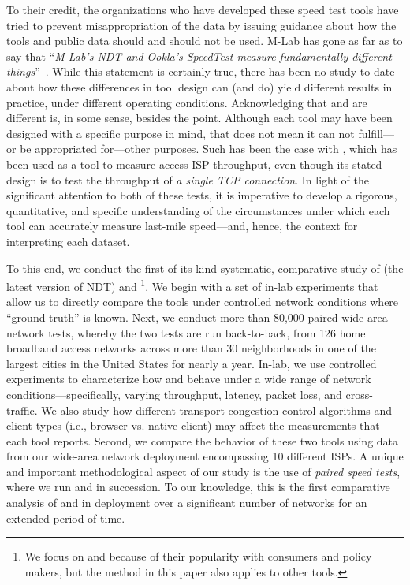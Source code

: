 To their credit, the organizations who have developed these speed test tools
have tried to prevent misappropriation of the data by issuing guidance about how
the tools and public data should and should not be used. M-Lab has gone as far
as to say that ``\textit{M-Lab's NDT and Ookla's SpeedTest measure fundamentally
different things}''~\cite{mlab-issue-email-1}. While this statement is certainly
true, there has been no study to date about how these differences in tool design
can (and do) yield different results in practice, under different operating
conditions. Acknowledging that \ookla and \ndt are different is, in some sense,
besides the point. %
Although each tool may have been designed with a specific purpose in mind, that
does not mean it can not fulfill---or be appropriated for---other purposes. Such
has been the case with \ndt, which has been used as a tool to measure access ISP
throughput, even though its stated design is to test the throughput of {\em a
single TCP connection}. In light of the significant attention to both of these
tests, it is imperative to develop a rigorous, quantitative, and specific
understanding of the circumstances under which each tool can accurately measure
last-mile speed---and, hence, the context for interpreting each dataset.

To this end, we conduct the first-of-its-kind systematic, comparative study of
\ndt (the latest version of NDT) and \ookla \footnote{We focus on \ookla and \ndt because of   
their popularity with consumers and policy 
makers, but
the method in this paper also applies to other tools.}. We begin 
with a set of in-lab
experiments that allow us to directly compare the tools under controlled network
conditions where ``ground truth'' is known. Next, we conduct more than 80,000
paired wide-area network tests, whereby the two tests are run back-to-back, from
126 home broadband access networks across more than 30 neighborhoods in
one of the largest cities in the United States for nearly a year. In-lab, we use
controlled experiments to characterize how \ndt and \ookla behave under a wide
range of network conditions---specifically, varying throughput, latency, packet
loss, and cross-traffic. We also study how different transport congestion
control algorithms and client types (i.e., browser vs. native client) may affect
the measurements that each tool reports.  Second, we compare the behavior of
these two tools using data from our wide-area network deployment encompassing 10
different ISPs. A unique and important methodological aspect of our study is the
use of \textit{paired speed tests}, where we run \ookla and \ndt in succession.
To our knowledge, this is the first comparative analysis of \ookla and \ndt in
deployment over a significant number of networks for an extended period of time. 


